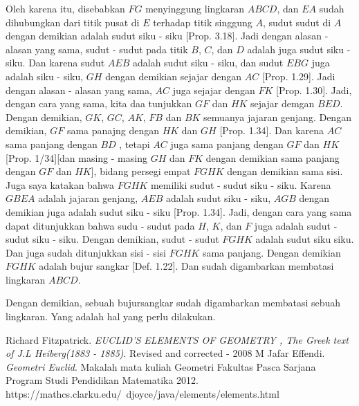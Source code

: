 \documentclass[a4paper]{book}
\begin{document}
Oleh karena itu,  disebabkan $FG$ menyinggung lingkaran $ABCD$, dan $EA$ sudah
dihubungkan dari titik pusat di $E$ terhadap titik singgung $A$, sudut sudut di 
$A$ dengan demikian adalah sudut siku - siku [Prop. 3.18]. Jadi dengan alasan - alasan yang sama,  sudut - sudut pada titik $B$, $C$, dan $D$ adalah juga sudut
siku - siku. Dan karena sudut $AEB$ adalah sudut siku - siku, dan sudut $EBG$ juga
adalah siku - siku, $GH$ dengan demikian sejajar dengan $AC$ [Prop. 1.29]. Jadi
dengan alasan - alasan yang sama, $AC$ juga sejajar dengan $FK$ [Prop. 1.30].
Jadi, dengan cara yang sama, kita daa tunjukkan $GF$ dan $HK$ sejajar demgan
$BED$. Dengan demikian, $GK$, $GC$, $AK$, $FB$ dan $BK$ semuanya jajaran genjang.
Dengan demikian, $GF$ sama panajng dengan $HK$ dan $GH$ [Prop. 1.34]. Dan karena
$AC$ sama panjang dengan $BD$ , tetapi $AC$ juga sama panjang dengan $GF$ dan $HK$
[Prop. 1/34][dan masing - masing $GH$ dan $FK$ dengan demikian sama panjang 
dengan $GF$ dan $HK$], bidang persegi empat $FGHK$ dengan demikian sama sisi. Juga
saya katakan bahwa $FGHK$ memiliki sudut - sudut siku - siku. Karena $GBEA$
adalah jajaran genjang, $AEB$ adalah sudut siku - siku, $AGB$ dengan demikian
juga adalah sudut siku - siku [Prop. 1.34]. Jadi, dengan cara yang sama dapat
ditunjukkan bahwa sudu - sudut pada $H$, $K$, dan $F$ juga adalah sudut - sudut
siku - siku. Dengan demikian, sudut - sudut $FGHK$ adalah sudut siku siku. Dan 
juga sudah ditunjukkan sisi - sisi $FGHK$ sama panjang. Dengan demikian $FGHK$ 
adalah bujur sangkar [Def. 1.22]. Dan sudah digambarkan membatasi lingkaran 
$ABCD$.

Dengan demikian, sebuah bujursangkar sudah digambarkan membatasi sebuah lingkaran.
Yang adalah hal yang perlu dilakukan.


\begin{thebibliography}{9} 
Richard Fitzpatrick.
\textit{EUCLID’S ELEMENTS OF GEOMETRY , The Greek text of J.L Heiberg(1883 - 1885)}.
Revised and corrected - 2008 
M Jafar Effendi.
\textit{Geometri Euclid}.
Makalah mata kuliah Geometri Fakultas Pasca Sarjana Program Studi Pendidikan Matematika 2012.
https://mathcs.clarku.edu/~djoyce/java/elements/elements.html 
\end{thebibliography}
\end{document}
